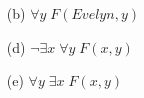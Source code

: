 \documentclass[12pt,addpoints]{exam}
\newcommand{\ra}{\rightarrow}
\begin{document}
\begin{questions}
\begin{solution}
\begin{itemize}
        \item[(b)] $\forall y\; F(Evelyn, y)$
        \item[(d)] $\neg \exists x\; \forall y\; F(x,y)$
        \item[(e)] $ \forall y\; \exists x\; F(x,y)$
    \end{itemize}
    \end{solution}


\end{questions}
\end{document}
